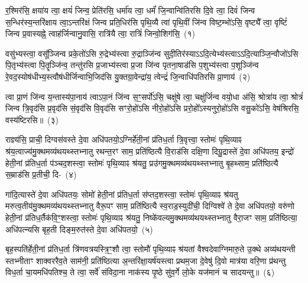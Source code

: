 \setcounter{anuvakam}{0}
र॒श्मिर॑सि॒ क्षया॑य त्वा॒ क्षयं॑ जिन्व॒ प्रेति॑रसि॒ धर्मा॑य त्वा॒ धर्मं॑ जि॒न्वान्वि॑तिरसि दि॒वे त्वा॒ दिवं॑ जिन्व स॒न्धिर॑स्य॒न्तरि॑क्षाय त्वा॒ऽन्तरि॑क्षं जिन्व प्रति॒धिर॑सि पृथि॒व्यै त्वा॑ पृथि॒वीं जि॑न्व विष्ट॒म्भो॑\-ऽसि॒ वृष्ट्यै᳚ त्वा॒ वृष्टिं॑ जिन्व प्र॒वास्यह्ने॒ त्वाह॑र्जिन्वानु॒वासि॒ रात्रि॑यै त्वा॒ रात्रिं॑ जिन्वो॒शिग॑सि॒~(१)\ip

वसु॑भ्यस्त्वा॒ वसू᳚ञ्जिन्व प्रके॒तो॑\-ऽसि रु॒द्रेभ्य॑स्त्वा रु॒द्राञ्जि॑न्व सुदी॒तिर॑स्याऽऽदि॒त्येभ्य॑स्त्वा\-ऽऽ\-दि॒त्याञ्जि॒न्वौजो॑\-ऽसि पि॒तृभ्य॑स्त्वा पि॒तॄञ्जि॑न्व॒ तन्तु॑रसि प्र॒जाभ्य॑स्त्वा प्र॒जा जि॑न्व पृतना॒षाड॑सि प॒शुभ्य॑स्त्वा प॒शूञ्जि॑न्व रे॒वद॒स्योष॑धीभ्य॒स्त्वौष॑धीर्जिन्वाभि॒जिद॑सि यु॒क्तग्रा॒वेन्द्रा॑य॒ त्वेन्द्रं॑ जि॒न्वाधि॑\-पतिरसि प्रा॒णाय॑~(२)\ip

त्वा प्रा॒णं जि॑न्व य॒न्तास्य॑पा॒नाय॑ त्वाऽपा॒नं जि॑न्व स॒ꣳ॒सर्पो॑\-ऽसि॒ चक्षु॑षे त्वा॒ चक्षु॑र्जिन्व वयो॒धा अ॑सि॒ श्रोत्रा॑य त्वा॒ श्रोत्रं॑ जिन्व त्रि॒वृद॑सि प्र॒वृद॑सि सं॒वृद॑सि वि॒वृद॑सि सꣳरो॒हो॑\-ऽसि नीरो॒हो॑\-ऽसि प्ररो॒हो᳚\-ऽस्यनुरो॒हो॑\-ऽसि वसु॒को॑\-ऽसि॒ वेष॑श्रिरसि॒ वस्य॑ष्टिरसि॥~(३)\ip

{\anuvakamend[{उ॒शिग॑सि प्रा॒णाय॒ त्रिच॑त्वारिꣳशच्च}]}

राज्ञ्य॑सि॒ प्राची॒ दिग्वस॑वस्ते दे॒वा अधि॑पतयो॒\-ऽग्निर्\mbox{}हे॑ती॒नां प्र॑तिध॒र्ता त्रि॒वृत्त्वा॒ स्तोमः॑ पृथि॒व्याꣴ श्र॑य॒त्वाज्य॑मु॒क्थ\-मव्य॑थयथ्स्तभ्नातु रथन्त॒रꣳ साम॒ प्रति॑ष्ठित्यै वि॒राड॑सि दक्षि॒णा दिग्रु॒द्रास्ते॑ दे॒वा अधि॑पतय॒ इन्द्रो॑ हेती॒नां प्र॑तिध॒र्ता प॑ञ्चद॒शस्त्वा॒ स्तोमः॑ पृथि॒व्याꣴ श्र॑यतु॒ प्रउ॑गमु॒क्थमव्य॑थयथ्स्तभ्नातु बृ॒हथ्साम॒ प्रति॑ष्ठित्यै स॒म्राड॑सि प्र॒तीची॒ दि-~(४)\ip

गा॑दि॒त्यास्ते॑ दे॒वा अधि॑पतयः॒ सोमो॑ हेती॒नां प्र॑तिध॒र्ता स॑प्तद॒शस्त्वा॒ स्तोमः॑ पृथि॒व्याꣴ श्र॑यतु मरुत्व॒तीय॑मु॒क्थ\-मव्य॑थयथ्स्तभ्नातु वैरू॒पꣳ साम॒ प्रति॑ष्ठित्यै स्व॒राड॒स्युदी॑ची॒ दिग्विश्वे॑ ते दे॒वा अधि॑पतयो॒ वरु॑णो हेती॒नां प्र॑तिध॒र्तैक॑\-वि॒ꣳ॒शस्त्वा॒ स्तोमः॑ पृथि॒व्याꣴ श्र॑यतु॒ निष्के॑वल्यमु॒क्थमव्य॑थयथ्स्तभ्नातु वैरा॒जꣳ साम॒ प्रति॑ष्ठित्या॒ अधि॑पत्न्यसि बृह॒ती दिङ्म॒रुत॑स्ते दे॒वा अधि॑पतयो॒~(५)\ip

बृह॒स्पति॑र्\mbox{}हेती॒नां प्र॑तिध॒र्ता त्रि॑णवत्रयस्त्रि॒ꣳ॒शौ त्वा॒ स्तोमौ॑ पृथि॒व्याꣴ श्र॑यतां वैश्वदेवाग्निमारु॒ते उ॒क्थे अव्य॑थयन्ती स्तभ्नीताꣳ शाक्वररैव॒ते साम॑नी॒ प्रति॑ष्ठित्या अ॒न्तरि॑क्षा॒यर्\mbox{}ष॑यस्त्वा प्रथम॒जा दे॒वेषु॑ दि॒वो मात्र॑या वरि॒णा प्र॑थन्तु विध॒र्ता चा॒यमधि॑\-पतिश्च॒ ते त्वा॒ सर्वे॑ संविदा॒ना नाक॑स्य पृ॒ष्ठे सु॑व॒र्गे लो॒के यज॑मानं च सादयन्तु॥~(६)\ip

